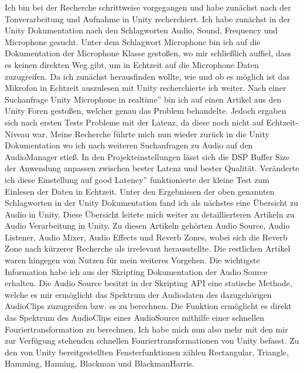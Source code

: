 Ich bin bei der Recherche schrittweise vorgegangen und habe zunächst nach der Tonverarbeitung und Aufnahme in Unity recherchiert. Ich habe zunächst in der Unity Dokumentation nach den Schlagworten Audio, Sound, Frequency und Microphone gesucht. Unter dem Schlagwort Microphone bin ich auf die Dokumentation der Microphone Klasse gestoßen, wo mir schließlich auffiel, dass es keinen direkten Weg gibt, um in Echtzeit auf die Microphone Daten zuzugreifen. \cite{unity_doku_micro} Da ich zunächst herausfinden wollte, wie und ob es möglich ist das Mikrofon in Echtzeit auszulesen mit Unity recherchierte ich weiter. Nach einer Suchanfrage \glqq Unity Microphone in realtime'' bin ich auf einen Artikel aus den Unity Foren gestoßen, welcher genau das Problem behandelte. \cite{unity_forum_realtime} Jedoch ergaben sich nach ersten Tests Probleme mit der Latenz, da diese noch nicht auf Echtzeit-Niveau war. Meine Recherche führte mich nun wieder zurück in die Unity Dokumentation wo ich nach weiteren Suchanfragen zu Audio auf den AudioManager stieß. In den Projekteinstellungen lässt sich die DSP Buffer Size der Anwendung anpassen zwischen bester Latenz und bester Qualität. \cite{unity_doku_audioManager} Veränderte ich diese Einstellung auf \glqq good Latency'' funktionierte der kleine Test zum Einlesen der Daten in Echtzeit. Unter den Ergebnissen der oben genannten Schlagworten in der Unity Dokumentation fand ich als nächstes eine Übersicht zu Audio in Unity. \cite{unity_doku_audio} Diese Übersicht leitete mich weiter zu detaillierteren Artikeln zu Audio Verarbeitung in Unity. Zu diesen Artikeln gehörten Audio Source, Audio Listener, Audio Mixer, Audio Effects und Reverb Zones, wobei sich die Reverb Zone nach kürzerer Recherche als irrelevant herausstellte. Die restlichen Artikel waren hingegen von Nutzen für mein weiteres Vorgehen. Die wichtigste Information habe ich aus der Skripting Dokumentation der Audio Source erhalten. Die Audio Source besitzt in der Skripting API eine statische Methode, welche es mir ermöglicht das Spektrum der Audiodaten des dazugehörigen AudioClips zuzugreifen bzw. es zu berechnen. \cite{unity_doku_spectrumData}
Die Funktion ermöglicht es direkt das Spektrum des AudioClips einer AudioSource mithilfe einer schnellen Fouriertransformation zu berechnen. Ich habe mich nun also mehr mit den mir zur Verfügung stehenden schnellen Fouriertransformationen von Unity befasst. Zu den von Unity bereitgestellten Fensterfunktionen zählen Rectangular, Triangle, Hamming, Hanning, Blackman und BlackmanHarris. 
\\ %
